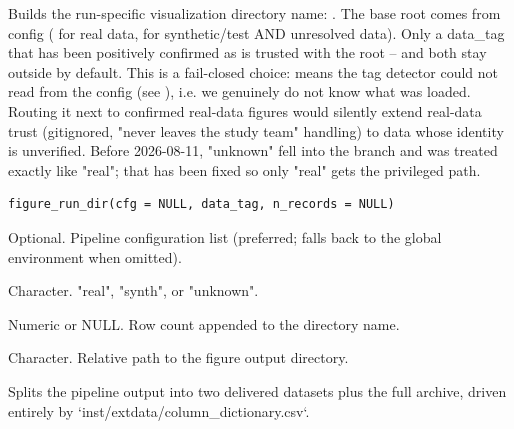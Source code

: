 \documentclass[a4paper]{book}
\begin{document}
%
\begin{Description}
Builds the run-specific visualization directory name:
. The base root comes from
config ( for real data, 
for synthetic/test AND unresolved data). Only a data\_tag that has been
positively confirmed as  is trusted with the 
root --  and  both stay outside 
by default. This is a fail-closed choice:  means the tag
detector could not read  from the config (see
), i.e. we genuinely do not know what was
loaded. Routing it next to confirmed real-data figures would silently
extend real-data trust (gitignored, "never leaves the study team" handling)
to data whose identity is unverified. Before 2026-08-11, "unknown" fell
into the  branch and was treated exactly like "real"; that has
been fixed so only "real" gets the privileged path.
\end{Description}
%
\begin{Usage}
\begin{verbatim}
figure_run_dir(cfg = NULL, data_tag, n_records = NULL)
\end{verbatim}
\end{Usage}
%
\begin{Arguments}
\begin{ldescription}
\item[\code{cfg}] Optional. Pipeline configuration list (preferred; falls back to
the global environment when omitted).

\item[\code{data\_tag}] Character. "real", "synth", or "unknown".

\item[\code{n\_records}] Numeric or NULL. Row count appended to the directory name.
\end{ldescription}
\end{Arguments}
%
\begin{Value}
Character. Relative path to the figure output directory.
\end{Value}
%
\begin{Description}
Splits the pipeline output into two delivered datasets plus the full
archive, driven entirely by `inst/extdata/column\_dictionary.csv`.
\end{Description}
\end{document}
